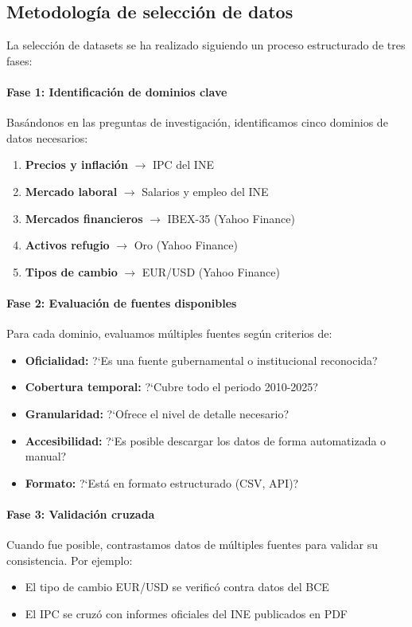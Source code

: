 \documentclass{article}
\begin{document}
\subsection{Metodolog\'ia de selecci\'on de datos}

La selecci\'on de datasets se ha realizado siguiendo un proceso estructurado de tres fases:

\paragraph{Fase 1: Identificaci\'on de dominios clave}
Bas\'andonos en las preguntas de investigaci\'on, identificamos cinco dominios de datos necesarios:
\begin{enumerate}
    \item \textbf{Precios y inflaci\'on} $\rightarrow$ IPC del INE
    \item \textbf{Mercado laboral} $\rightarrow$ Salarios y empleo del INE
    \item \textbf{Mercados financieros} $\rightarrow$ IBEX-35 (Yahoo Finance)
    \item \textbf{Activos refugio} $\rightarrow$ Oro (Yahoo Finance)
    \item \textbf{Tipos de cambio} $\rightarrow$ EUR/USD (Yahoo Finance)
\end{enumerate}

\paragraph{Fase 2: Evaluaci\'on de fuentes disponibles}
Para cada dominio, evaluamos m\'ultiples fuentes seg\'un criterios de:
\begin{itemize}
    \item \textbf{Oficialidad:} ?`Es una fuente gubernamental o institucional reconocida?
    \item \textbf{Cobertura temporal:} ?`Cubre todo el periodo 2010-2025?
    \item \textbf{Granularidad:} ?`Ofrece el nivel de detalle necesario?
    \item \textbf{Accesibilidad:} ?`Es posible descargar los datos de forma automatizada o manual?
    \item \textbf{Formato:} ?`Est\'a en formato estructurado (CSV, API)?
\end{itemize}

\paragraph{Fase 3: Validaci\'on cruzada}
Cuando fue posible, contrastamos datos de m\'ultiples fuentes para validar su consistencia. Por ejemplo:
\begin{itemize}
    \item El tipo de cambio EUR/USD se verific\'o contra datos del BCE
    \item El IPC se cruz\'o con informes oficiales del INE publicados en PDF
\end{itemize}
\end{document}
